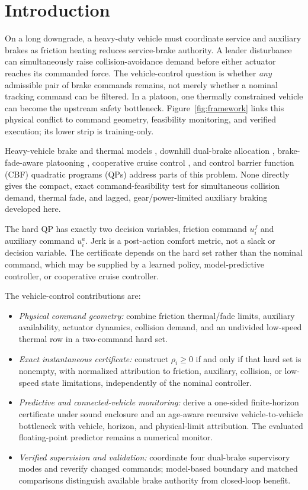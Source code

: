\section{Introduction}
On a long downgrade, a heavy-duty vehicle must coordinate service and auxiliary brakes as friction heating reduces service-brake authority. A leader disturbance can simultaneously raise collision-avoidance demand before either actuator reaches its commanded force. The vehicle-control question is whether \emph{any} admissible pair of brake commands remains, not merely whether a nominal tracking command can be filtered. In a platoon, one thermally constrained vehicle can become the upstream safety bottleneck. Figure~\ref{fig:framework} links this physical conflict to command geometry, feasibility monitoring, and verified execution; its lower strip is training-only.

Heavy-vehicle brake and thermal models \cite{nhtsa2010scam,talati2009brake}, downhill dual-brake allocation \cite{li2025retarder}, brake-fade-aware platooning \cite{devika2022fade}, cooperative cruise control \cite{naus2010string,ploeg2011cacc}, and control barrier function (CBF) quadratic programs (QPs) \cite{ames2017cbf,xiao2022hocbf} address parts of this problem. None directly gives the compact, exact command-feasibility test for simultaneous collision demand, thermal fade, and lagged, gear/power-limited auxiliary braking developed here.

The hard QP has exactly two decision variables, friction command $u_i^f$ and auxiliary command $u_i^a$. Jerk is a post-action comfort metric, not a slack or decision variable. The certificate depends on the hard set rather than the nominal command, which may be supplied by a learned policy, model-predictive controller, or cooperative cruise controller.

The vehicle-control contributions are:
\begin{itemize}
\item \emph{Physical command geometry:} combine friction thermal/fade limits, auxiliary availability, actuator dynamics, collision demand, and an undivided low-speed thermal row in a two-command hard set.
\item \emph{Exact instantaneous certificate:} construct $\rho_i\ge0$ if and only if that hard set is nonempty, with normalized attribution to friction, auxiliary, collision, or low-speed state limitations, independently of the nominal controller.
\item \emph{Predictive and connected-vehicle monitoring:} derive a one-sided finite-horizon certificate under sound enclosure and an age-aware recursive vehicle-to-vehicle bottleneck with vehicle, horizon, and physical-limit attribution. The evaluated floating-point predictor remains a numerical monitor.
\item \emph{Verified supervision and validation:} coordinate four dual-brake supervisory modes and reverify changed commands; model-based boundary and matched comparisons distinguish available brake authority from closed-loop benefit.
\end{itemize}

